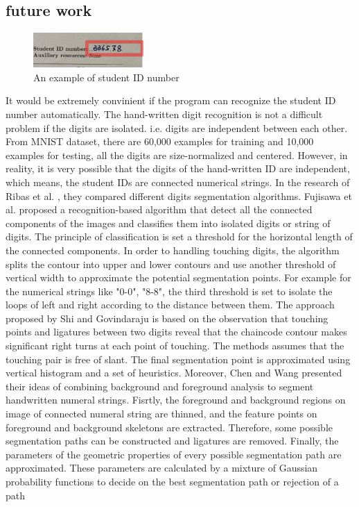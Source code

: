 \documentclass[a4paper,twoside]{article}
\begin{document}
\subsection{future work}
\begin{figure}[!h]
  \centering
  \includegraphics[width=0.8\columnwidth]{Latex/imgs/digit.PNG}
  \caption{An example of student ID number}
  \label{fig: ID}
 \end{figure}
It would be extremely convinient if the program can recognize the student ID number automatically. The hand-written digit recognition is not a difficult problem if the digits are isolated. i.e. digits are independent between each other. From MNIST dataset, there are 60,000 examples for training and 10,000 examples for testing, all the digits are size-normalized and centered. However, in reality, it is very possible that the digits of the hand-written ID are independent, which means, the student IDs are connected numerical strings. In the research of Ribas et al. \cite{ribas2013handwritten}, they compared different digits segmentation algorithms. Fujisawa et al. \cite{fujisawa1992segmentation} proposed a recognition-based algorithm that detect all the connected components of the images and classifies them into isolated digits or string of digits. The principle of classification is set a threshold for the horizontal length of the connected components. In order to handling touching digits, the algorithm splits the contour into upper and lower contours and use another threshold of vertical width to approximate the potential segmentation points. For example for the numerical strings like "0-0", "8-8", the third threshold is set to isolate the loops of left and right according to the distance between them. The approach proposed by Shi and Govindaraju \cite{shi1997segmentation} is based on the observation that touching points and ligatures between two
digits reveal that the chaincode contour makes significant right turns at each point of touching. The methods assumes that the touching pair is free of slant. The final segmentation point is approximated using vertical histogram and a set of heuristics. Moreover, Chen and Wang \cite{chen2000segmentation} presented their ideas of combining background and foreground analysis to segment handwritten numeral strings. Fisrtly, the foreground and background regions on image of connected numeral string are thinned, and
the feature points on foreground and background skeletons
are extracted. Therefore, some possible segmentation paths can be constructed and ligatures are removed. Finally, the parameters of the geometric properties of every possible segmentation path are approximated. These parameters are calculated
by a mixture of Gaussian probability functions to decide on
the best segmentation path or rejection of a path 
\end{document}
